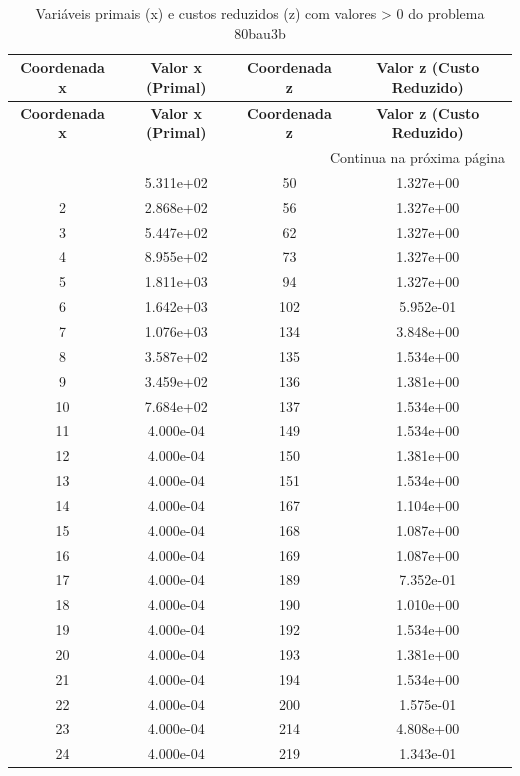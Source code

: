 \documentclass[12pt]{article}
\begin{document}
\begin{longtable}{@{}cccc@{}}
\caption{Variáveis primais (x) e custos reduzidos (z) com valores > 0 do problema 80bau3b} \\
\toprule
\textbf{Coordenada x} & \textbf{Valor x (Primal)} & \textbf{Coordenada z} & \textbf{Valor z (Custo Reduzido)} \\
\midrule
\endfirsthead

\toprule
\textbf{Coordenada x} & \textbf{Valor x (Primal)} & \textbf{Coordenada z} & \textbf{Valor z (Custo Reduzido)} \\
\midrule
\endhead

\midrule \multicolumn{4}{r}{{Continua na próxima página}} \\ \midrule
\endfoot

\bottomrule
\endlastfoot
1 & 5.311e+02 & 50 & 1.327e+00 \\
2 & 2.868e+02 & 56 & 1.327e+00 \\
3 & 5.447e+02 & 62 & 1.327e+00 \\
4 & 8.955e+02 & 73 & 1.327e+00 \\
5 & 1.811e+03 & 94 & 1.327e+00 \\
6 & 1.642e+03 & 102 & 5.952e-01 \\
7 & 1.076e+03 & 134 & 3.848e+00 \\
8 & 3.587e+02 & 135 & 1.534e+00 \\
9 & 3.459e+02 & 136 & 1.381e+00 \\
10 & 7.684e+02 & 137 & 1.534e+00 \\
11 & 4.000e-04 & 149 & 1.534e+00 \\
12 & 4.000e-04 & 150 & 1.381e+00 \\
13 & 4.000e-04 & 151 & 1.534e+00 \\
14 & 4.000e-04 & 167 & 1.104e+00 \\
15 & 4.000e-04 & 168 & 1.087e+00 \\
16 & 4.000e-04 & 169 & 1.087e+00 \\
17 & 4.000e-04 & 189 & 7.352e-01 \\
18 & 4.000e-04 & 190 & 1.010e+00 \\
19 & 4.000e-04 & 192 & 1.534e+00 \\
20 & 4.000e-04 & 193 & 1.381e+00 \\
21 & 4.000e-04 & 194 & 1.534e+00 \\
22 & 4.000e-04 & 200 & 1.575e-01 \\
23 & 4.000e-04 & 214 & 4.808e+00 \\
24 & 4.000e-04 & 219 & 1.343e-01 \\

\end{longtable}
\end{document}
